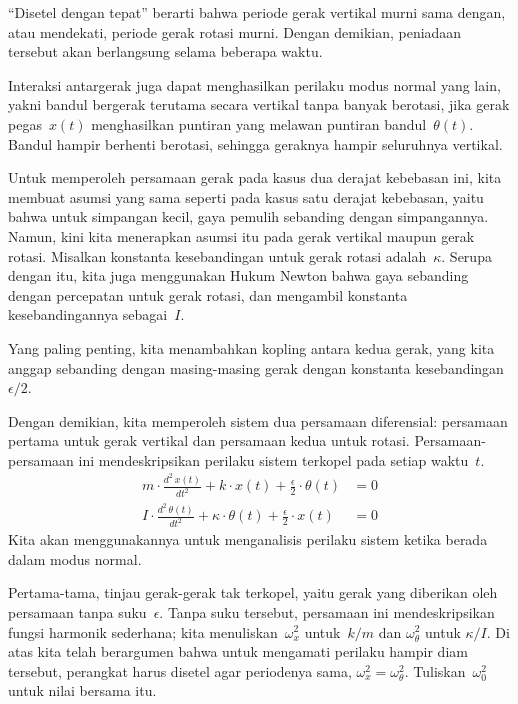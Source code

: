 ``Disetel dengan tepat'' berarti bahwa  
periode gerak vertikal murni sama dengan, 
atau mendekati, periode gerak rotasi murni.
Dengan demikian, peniadaan tersebut akan berlangsung selama beberapa waktu. 

Interaksi antargerak juga dapat menghasilkan perilaku modus normal yang lain, 
yakni bandul bergerak terutama secara vertikal tanpa banyak berotasi,
jika gerak pegas~$x(t)$ 
menghasilkan puntiran yang melawan puntiran bandul~$\theta(t)$.
Bandul hampir berhenti berotasi, sehingga
geraknya hampir seluruhnya vertikal.

Untuk memperoleh persamaan gerak pada kasus dua derajat kebebasan ini,
kita membuat asumsi yang sama seperti pada kasus satu derajat kebebasan,
yaitu bahwa untuk simpangan kecil, gaya pemulih
sebanding dengan simpangannya. 
Namun, kini kita menerapkan asumsi itu pada
gerak vertikal maupun gerak rotasi.
Misalkan konstanta kesebandingan untuk gerak rotasi adalah~$\kappa$.
Serupa dengan itu, kita juga menggunakan Hukum Newton bahwa gaya sebanding dengan 
percepatan untuk gerak rotasi, dan mengambil
konstanta kesebandingannya sebagai~$I$. 

Yang paling penting, kita menambahkan kopling antara kedua
gerak, yang kita anggap sebanding dengan masing-masing gerak dengan konstanta 
kesebandingan~$\epsilon/2$.

Dengan demikian, kita memperoleh sistem dua persamaan diferensial:
persamaan pertama untuk gerak vertikal dan persamaan kedua
untuk rotasi.
Persamaan-persamaan ini mendeskripsikan perilaku sistem terkopel pada setiap waktu~$t$.
\begin{equation*}
  \begin{split}
  m\cdot\frac{d^2\,x(t)}{dt^2}
      +k\cdot x(t)+\frac{\epsilon}{2}\cdot \theta(t) 
      &=0  \\
  I\cdot\frac{d^2\,\theta(t)}{dt^2}
      +\kappa\cdot \theta(t)+\frac{\epsilon}{2}\cdot x(t)  
      &=0
  \end{split}
  \tag{$**$}
\end{equation*}
Kita akan menggunakannya untuk menganalisis
perilaku sistem ketika berada dalam modus normal.

Pertama-tama, tinjau gerak-gerak tak terkopel, yaitu gerak yang diberikan oleh
persamaan tanpa suku~$\epsilon$.
Tanpa suku tersebut, persamaan ini mendeskripsikan fungsi harmonik sederhana;
kita menuliskan~$\omega_x^2$ untuk~$k/m$ dan $\omega_\theta^2$ untuk $\kappa/I$.
Di atas kita telah berargumen bahwa untuk mengamati perilaku hampir diam tersebut,
perangkat harus disetel agar periodenya sama, $\omega_x^2=\omega_\theta^2$. 
Tuliskan~$\omega_0^2$ untuk nilai bersama itu.

